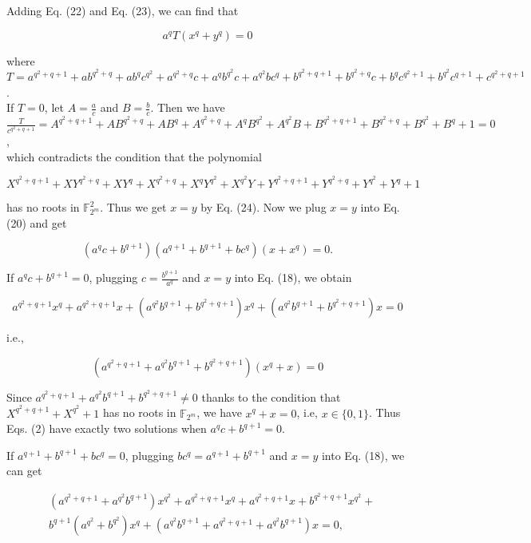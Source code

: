 \documentclass[10pt]{article}
\begin{document}
Adding Eq. (22) and Eq. (23), we can find that


\begin{equation*}
a^{q} T\left(x^{q}+y^{q}\right)=0 \tag{24}
\end{equation*}


where\\
$T=a^{q^{2}+q+1}+a b^{q^{2}+q}+a b^{q} c^{q^{2}}+a^{q^{2}+q} c+a^{q} b^{q^{2}} c+a^{q^{2}} b c^{q}+b^{q^{2}+q+1}+b^{q^{2}+q} c+b^{q} c^{q^{2}+1}+b^{q^{2}} c^{q+1}+c^{q^{2}+q+1}$.\\
If $T=0$, let $A=\frac{a}{c}$ and $B=\frac{b}{c}$. Then we have\\
$\frac{T}{c^{q^{2}+q+1}}=A^{q^{2}+q+1}+A B^{q^{2}+q}+A B^{q}+A^{q^{2}+q}+A^{q} B^{q^{2}}+A^{q^{2}} B+B^{q^{2}+q+1}+B^{q^{2}+q}+B^{q^{2}}+B^{q}+1=0$,\\
which contradicts the condition that the polynomial

$$
X^{q^{2}+q+1}+X Y^{q^{2}+q}+X Y^{q}+X^{q^{2}+q}+X^{q} Y^{q^{2}}+X^{q^{2}} Y+Y^{q^{2}+q+1}+Y^{q^{2}+q}+Y^{q^{2}}+Y^{q}+1
$$

has no roots in $\mathbb{F}_{2^{m}}^{2}$. Thus we get $x=y$ by Eq. (24). Now we plug $x=y$ into Eq. (20) and get


\begin{equation*}
\left(a^{q} c+b^{q+1}\right)\left(a^{q+1}+b^{q+1}+b c^{q}\right)\left(x+x^{q}\right)=0 . \tag{25}
\end{equation*}


If $a^{q} c+b^{q+1}=0$, plugging $c=\frac{b^{q+1}}{a^{q}}$ and $x=y$ into Eq. (18), we obtain

$$
a^{q^{2}+q+1} x^{q}+a^{q^{2}+q+1} x+\left(a^{q^{2}} b^{q+1}+b^{q^{2}+q+1}\right) x^{q}+\left(a^{q^{2}} b^{q+1}+b^{q^{2}+q+1}\right) x=0
$$

i.e.,

$$
\left(a^{q^{2}+q+1}+a^{q^{2}} b^{q+1}+b^{q^{2}+q+1}\right)\left(x^{q}+x\right)=0
$$

Since $a^{q^{2}+q+1}+a^{q^{2}} b^{q+1}+b^{q^{2}+q+1} \neq 0$ thanks to the condition that $X^{q^{2}+q+1}+X^{q^{2}}+1$ has no roots in $\mathbb{F}_{2^{m}}$, we have $x^{q}+x=0$, i.e, $x \in\{0,1\}$. Thus Eqs. (2) have exactly two solutions when $a^{q} c+b^{q+1}=0$.

If $a^{q+1}+b^{q+1}+b c^{q}=0$, plugging $b c^{q}=a^{q+1}+b^{q+1}$ and $x=y$ into Eq. (18), we can get

$$
\begin{aligned}
& \left(a^{q^{2}+q+1}+a^{q^{2}} b^{q+1}\right) x^{q^{2}}+a^{q^{2}+q+1} x^{q}+a^{q^{2}+q+1} x+b^{q^{2}+q+1} x^{q^{2}}+ \\
& b^{q+1}\left(a^{q^{2}}+b^{q^{2}}\right) x^{q}+\left(a^{q^{2}} b^{q+1}+a^{q^{2}+q+1}+a^{q^{2}} b^{q+1}\right) x=0,
\end{aligned}
$$
\end{document}
